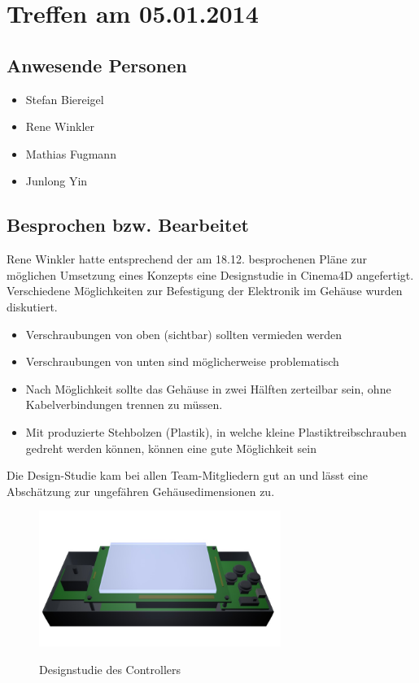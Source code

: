\chapter{Treffen am 05.01.2014}
\section{Anwesende Personen}
\begin{itemize}
	\item Stefan Biereigel
	\item Rene Winkler
	\item Mathias Fugmann
	\item Junlong Yin
\end{itemize}

\section{Besprochen bzw. Bearbeitet}
Rene Winkler hatte entsprechend der am 18.12. besprochenen Pläne zur möglichen Umsetzung eines Konzepts eine Designstudie in Cinema4D angefertigt. Verschiedene Möglichkeiten zur Befestigung der Elektronik im Gehäuse wurden diskutiert.
\begin{itemize}
	\item Verschraubungen von oben (sichtbar) sollten vermieden werden
	\item Verschraubungen von unten sind möglicherweise problematisch
	\item Nach Möglichkeit sollte das Gehäuse in zwei Hälften zerteilbar sein, ohne Kabelverbindungen trennen zu müssen.
	\item Mit produzierte Stehbolzen (Plastik), in welche kleine Plastiktreibschrauben gedreht werden können, können eine gute Möglichkeit sein
\end{itemize}

Die Design-Studie kam bei allen Team-Mitgliedern gut an und lässt eine Abschätzung zur ungefähren Gehäusedimensionen zu.

\begin{figure}
	\centering
	\includegraphics[width=0.7\textwidth]{bilder/studie_controller.jpg}
	\label{fig:designstudie1}
	\caption{Designstudie des Controllers}
\end{figure}

